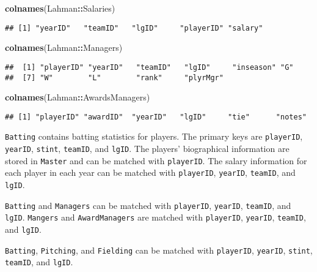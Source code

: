 \documentclass[]{article}
\newenvironment{Shaded}{\begin{snugshade}}{\end{snugshade}}
\newcommand{\KeywordTok}[1]{\textcolor[rgb]{0.13,0.29,0.53}{\textbf{#1}}}
\newcommand{\OperatorTok}[1]{\textcolor[rgb]{0.81,0.36,0.00}{\textbf{#1}}}
\newcommand{\NormalTok}[1]{#1}
\theoremstyle{definition}
\theoremstyle{definition}
\theoremstyle{definition}
\theoremstyle{remark}
\begin{document}
\begin{Shaded}
\begin{Highlighting}[]
\KeywordTok{colnames}\NormalTok{(Lahman}\OperatorTok{::}\NormalTok{Salaries)}
\end{Highlighting}
\end{Shaded}

\begin{verbatim}
## [1] "yearID"   "teamID"   "lgID"     "playerID" "salary"
\end{verbatim}

\begin{Shaded}
\begin{Highlighting}[]
\KeywordTok{colnames}\NormalTok{(Lahman}\OperatorTok{::}\NormalTok{Managers)}
\end{Highlighting}
\end{Shaded}

\begin{verbatim}
##  [1] "playerID" "yearID"   "teamID"   "lgID"     "inseason" "G"       
##  [7] "W"        "L"        "rank"     "plyrMgr"
\end{verbatim}

\begin{Shaded}
\begin{Highlighting}[]
\KeywordTok{colnames}\NormalTok{(Lahman}\OperatorTok{::}\NormalTok{AwardsManagers)}
\end{Highlighting}
\end{Shaded}

\begin{verbatim}
## [1] "playerID" "awardID"  "yearID"   "lgID"     "tie"      "notes"
\end{verbatim}

\texttt{Batting} contains batting statistics for players. The primary
keys are \texttt{playerID}, \texttt{yearID}, \texttt{stint},
\texttt{teamID}, and \texttt{lgID}. The players' biographical
information are stored in \texttt{Master} and can be matched with
\texttt{playerID}. The salary information for each player in each year
can be matched with \texttt{playerID}, \texttt{yearID}, \texttt{teamID},
and \texttt{lgID}.

\texttt{Batting} and \texttt{Managers} can be matched with
\texttt{playerID}, \texttt{yearID}, \texttt{teamID}, and \texttt{lgID}.
\texttt{Mangers} and \texttt{AwardManagers} are matched with
\texttt{playerID}, \texttt{yearID}, \texttt{teamID}, and \texttt{lgID}.

\texttt{Batting}, \texttt{Pitching}, and \texttt{Fielding} can be
matched with \texttt{playerID}, \texttt{yearID}, \texttt{stint},
\texttt{teamID}, and \texttt{lgID}.
\end{document}
